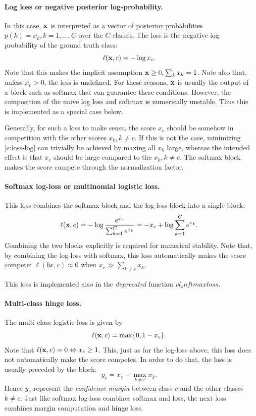 \paragraph{Log loss or negative posterior log-probability.} In this case, $\mathbf{x}$ is interpreted as a vector of posterior probabilities $p(k) = x_k, k=1,\dots, C$ over the $C$ classes. The loss is the negative log-probability of the ground truth class:
\begin{equation}\label{e:loss-log}
\ell(\mathbf{x}, c) = - \log x_c.
\end{equation}
Note that this makes the implicit assumption $\mathbf{x} \geq 0, \sum_k x_k = 1$. Note also that, unless $x_c > 0$, the loss is undefined. For these reasons, $\mathbf{x}$ is usually the output of a block such as softmax that can guarantee these conditions. However, the composition of the naive log loss and softmax is numerically unstable. Thus this is implemented as a special case below.

Generally, for such a loss to make sense, the score $x_c$ should be somehow in competition with the other scores $x_k, k\not = c$. If this is not the case, minimizing \eqref{e:loss-log} can trivially be achieved by maxing all $x_k$ large, whereas the intended effect is that $x_c$ should be large compared to the $x_k, k\not=c$. The softmax block makes the score compete through the normalization factor.

\paragraph{Softmax log-loss or multinomial logistic loss.} This loss combines the softmax block and the log-loss block into a single block:
\begin{equation}\label{e:loss-softmaxlog}
\ell(\mathbf{x}, c) = - \log \frac{e^{x_c}}{\sum_{k=1}^C e^{x_k}}
= - x_c + \log \sum_{k=1}^C e^{x_k}.
\end{equation}
Combining the two blocks explicitly is required for numerical stability. Note that, by combining the log-loss with softmax, this loss automatically makes the score compete: $\ell(bx,c) \approx 0$ when $x_c \gg \sum_{k\not= c} x_k$.

This loss is implemented also in the \emph{deprecated} function $vl_softmaxloss$.

\paragraph{Multi-class hinge loss.} The multi-class logistic loss is given by
\begin{equation}\label{e:loss-multiclasshinge}
\ell(\mathbf{x}, c) = \max\{0, 1 - x_c \}.
\end{equation}
Note that $\ell(\mathbf{x},c) =0 \Leftrightarrow x_c \geq 1$. This, just as for the log-loss above, this loss does not automatically make the score competes. In order to do that, the loss is usually preceded by the block:
\[
y_c = x_c - \max_{k \not= c} x_k.
\]
Hence $y_c$ represent the \emph{confidence margin} between class $c$ and the other classes $k \not= c$. Just like softmax log-loss combines softmax and loss, the next loss combines margin computation and hinge loss.

